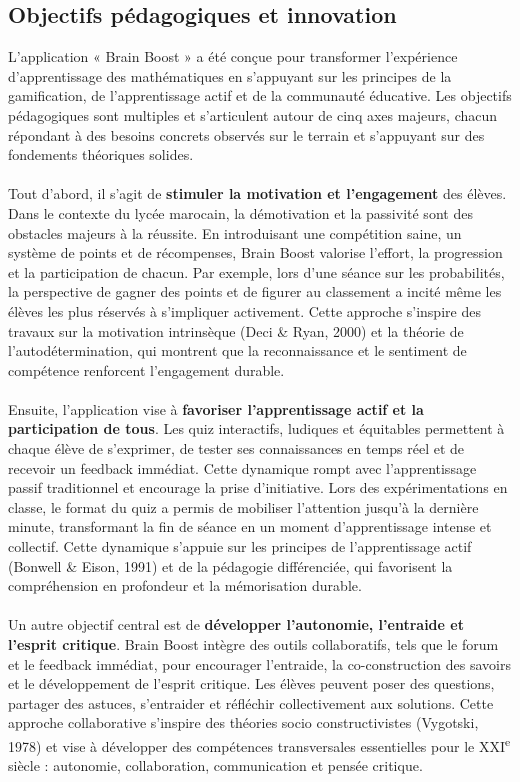 \documentclass[a4paper,11pt]{report}
\begin{document}
\subsection{Objectifs pédagogiques et innovation}
L'application « Brain Boost » a été conçue pour transformer l'expérience d'apprentissage des mathématiques en s'appuyant sur les principes de la gamification, de l'apprentissage actif et de la communauté éducative. Les objectifs pédagogiques sont multiples et s'articulent autour de cinq axes majeurs, chacun répondant à des besoins concrets observés sur le terrain et s'appuyant sur des fondements théoriques solides.\\ \\
Tout d'abord, il s'agit de \textbf{stimuler la motivation et l'engagement} des élèves. Dans le contexte du lycée marocain, la démotivation et la passivité sont des obstacles majeurs à la réussite. En introduisant une compétition saine, un système de points et de récompenses, Brain Boost valorise l'effort, la progression et la participation de chacun. Par exemple, lors d'une séance sur les probabilités, la perspective de gagner des points et de figurer au classement a incité même les élèves les plus réservés à s'impliquer activement. Cette approche s'inspire des travaux sur la motivation intrinsèque (Deci \& Ryan, 2000) et la théorie de l'autodétermination, qui montrent que la reconnaissance et le sentiment de compétence renforcent l'engagement durable.\\ \\
Ensuite, l'application vise à \textbf{favoriser l'apprentissage actif et la participation de tous}. Les quiz interactifs, ludiques et équitables permettent à chaque élève de s'exprimer, de tester ses connaissances en temps réel et de recevoir un feedback immédiat. Cette dynamique rompt avec l'apprentissage passif traditionnel et encourage la prise d'initiative. Lors des expérimentations en classe, le format du quiz a permis de mobiliser l'attention jusqu'à la dernière minute, transformant la fin de séance en un moment d'apprentissage intense et collectif. Cette dynamique s'appuie sur les principes de l'apprentissage actif (Bonwell \& Eison, 1991) et de la pédagogie différenciée, qui favorisent la compréhension en profondeur et la mémorisation durable.\\ \\
Un autre objectif central est de \textbf{développer l'autonomie, l'entraide et l'esprit critique}. Brain Boost intègre des outils collaboratifs, tels que le forum et le feedback immédiat, pour encourager l'entraide, la co-construction des savoirs et le développement de l'esprit critique. Les élèves peuvent poser des questions, partager des astuces, s'entraider et réfléchir collectivement aux solutions. Cette approche collaborative s'inspire des théories socio constructivistes (Vygotski, 1978) et vise à développer des compétences transversales essentielles pour le XXI\textsuperscript{e} siècle : autonomie, collaboration, communication et pensée critique.\\ \\
\end{document}
